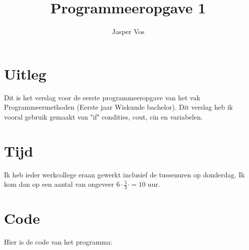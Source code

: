 \documentclass[10pt]{article}
\title{Programmeeropgave 1}
\author{Jasper Vos}
\begin{document}

\maketitle

\section{Uitleg}
Dit is het verslag voor de eerste programmeeropgave van het vak Programmeermethoden (Eerste jaar Wiskunde bachelor).
Dit verslag heb ik vooral gebruik gemaakt van "if" condities, cout, cin en variabelen.

\section{Tijd}
Ik heb ieder werkcollege eraan gewerkt inclusief de tussenuren op donderdag. 
Ik kom dan op een aantal van ongeveer $6\cdot\frac{5}{3} \cdot  = 10$ uur.

\section*{Code}
Hier is de code van het programma:


\end{document}
